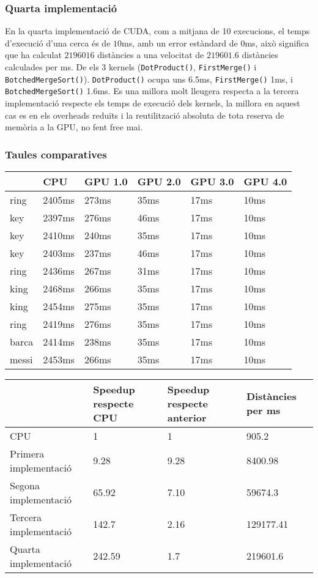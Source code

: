 \documentclass[catalan,10pt,a4paper]{article}
\begin{document}
\subsubsection*{Quarta implementació}
En la quarta implementació de CUDA, com a mitjana de 10 execucions, el temps d'execució d'una cerca és de $10$ms, amb un error estàndard de $0$ms, això significa que ha calculat $2196016$ distàncies a una velocitat de $219601.6$ distàncies calculades per ms. De els 3 kernels (\verb|DotProduct()|, \verb|FirstMerge()| i \verb|BotchedMergeSort()|). \verb|DotProduct()| ocupa uns 6.5ms, \verb|FirstMerge()| 1ms, i \verb|BotchedMergeSort()| 1.6ms. Es una millora molt lleugera respecta a la tercera implementació respecte els temps de execució dels kernels, la millora en aquest cas es en els overheads reduïts i la reutilització absoluta de tota reserva de memòria a la GPU, no fent free mai.

\subsubsection*{Taules comparatives}

\begin{table}[h]
\centering
\begin{tabular}{|l|l|l|l|l|l|}
\hline
      & CPU  & GPU 1.0 & GPU 2.0 & GPU 3.0 & GPU 4.0 \\ \hline
ring  & 2405ms & 273ms & 35ms & 17ms & 10ms \\ \hline
key   & 2397ms & 276ms & 46ms & 17ms & 10ms\\ \hline
key   & 2410ms & 240ms & 35ms & 17ms & 10ms\\ \hline
key   & 2403ms & 237ms & 46ms & 17ms & 10ms\\ \hline
ring  & 2436ms & 267ms & 31ms & 17ms & 10ms\\ \hline
king  & 2468ms & 266ms & 35ms & 17ms & 10ms\\ \hline
king  & 2454ms & 275ms & 35ms & 17ms & 10ms\\ \hline
ring  & 2419ms & 276ms & 35ms & 17ms & 10ms\\ \hline
barca & 2414ms & 238ms & 35ms & 17ms & 10ms\\ \hline
messi & 2453ms & 266ms & 35ms & 17ms & 10ms\\ \hline
\end{tabular}
\end{table}
\begin{table}[h]
\centering
\begin{tabular}{|l|l|l|l|}
\hline
      & Speedup respecte CPU & Speedup respecte anterior & Distàncies per ms \\ \hline
CPU & 1 & 1 & 905.2 \\ \hline
Primera implementació & 9.28 & 9.28 & 8400.98 \\ \hline
Segona implementació & 65.92 & 7.10 & 59674.3  \\ \hline
Tercera implementació & 142.7 & 2.16 & 129177.41  \\ \hline
Quarta implementació & 242.59 & 1.7 & 219601.6 \\ \hline
\end{tabular}
\end{table}
\end{document}
